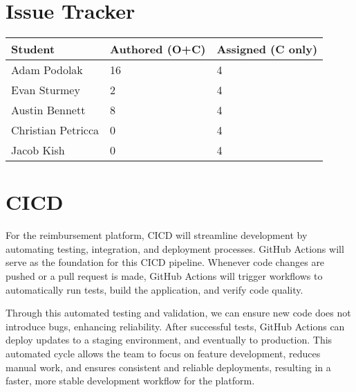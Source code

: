 \documentclass{article}
\begin{document}
\section{Issue Tracker}


\begin{table}[H]
\centering
\begin{tabular}{lll}
\toprule
\textbf{Student} & \textbf{Authored (O+C)} & \textbf{Assigned (C only)}\\
\midrule
Adam Podolak & 16 & 4 \\
Evan Sturmey & 2 & 4 \\
Austin Bennett & 8 & 4 \\
Christian Petricca & 0 & 4 \\
Jacob Kish & 0 & 4 \\
\bottomrule
\end{tabular}
\end{table}


\section{CICD}

For the reimbursement platform, CICD will streamline development by automating testing, integration, and deployment processes. GitHub Actions will serve as the foundation for this CICD pipeline. Whenever code changes are pushed or a pull request is made, GitHub Actions will trigger workflows to automatically run tests, build the application, and verify code quality.

Through this automated testing and validation, we can ensure new code does not introduce bugs, enhancing reliability. After successful tests, GitHub Actions can deploy updates to a staging environment, and eventually to production. This automated cycle allows the team to focus on feature development, reduces manual work, and ensures consistent and reliable deployments, resulting in a faster, more stable development workflow for the platform.


\end{document}
